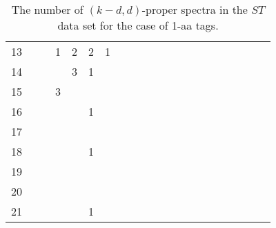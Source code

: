 \documentclass{article}[12pt]
\begin{document}
\begin{landscape}
\begin{table}[h]
{\begin{tabular}{|c|c|
c|c|c|c|c|c|c|c|c|c|c|c|c|c|c|c|c|c|c|}
13  &  &  & 1 & 2 & 2 & 1 &  &  &  &  &  &  &  &  &  &  &  &  &  & \\

14  &  &  &  & 3 & 1 &  &  &  &  &  &  &  &  &  &  &  &  &  &  & \\

15  &  &  & 3 &  &  &  &  &  &  &  &  &  &  &  &  &  &  &  &  & \\

16  &  &  &  &  & 1 &  &  &  &  &  &  &  &  &  &  &  &  &  &  & \\

17  &  &  &  &  &  &  &  &  &  &  &  &  &  &  &  &  &  &  &  & \\

18  &  &  &  &  & 1 &  &  &  &  &  &  &  &  &  &  &  &  &  &  & \\

19  &  &  &  &  &  &  &  &  &  &  &  &  &  &  &  &  &  &  &  & \\

20  &  &  &  &  &  &  &  &  &  &  &  &  &  &  &  &  &  &  &  & \\

21  &  &  &  &  & 1 &  &  &  &  &  &  &  &  &  &  &  &  &  &  & \\

  \hline
\end{tabular}
\par}
\centering
\caption{The number of $(k-d,d)$-proper spectra in the $ST$ data set for the case of 1-aa tags.}
\vspace{3mm}
\label{table:kd-1-proper-ST}
\end{table}
\end{landscape}
\end{document}
